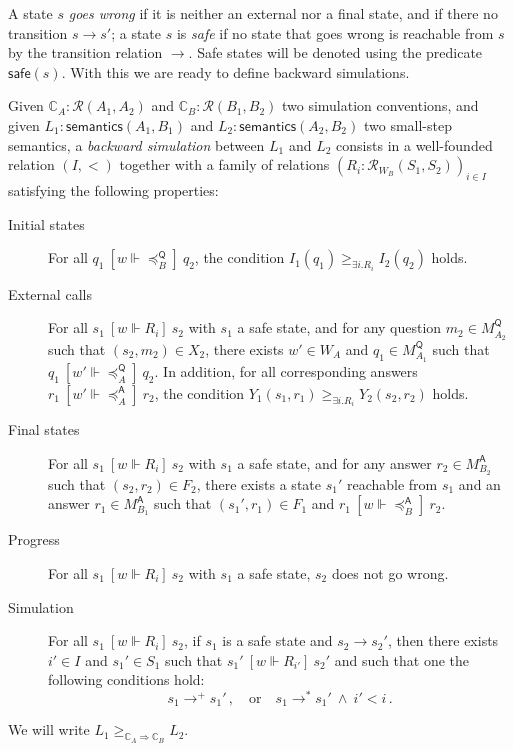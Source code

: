 \documentclass[acmsmall,timestamp,review]{acmart}
\newcommand{\kw}[1]{\ensuremath{ \mathsf{#1} }}
\newcommand{\ifr}[1]{\ [{#1}]\ }
\begin{document}
A state $s$ \emph{goes wrong}
if it is neither an external nor a final state,
and if there no transition $s \rightarrow s'$;
a state $s$ is \emph{safe}
if no state that goes wrong is reachable from $s$
by the transition relation $\rightarrow$.
Safe states will be denoted using the predicate $\kw{safe}(s)$.
With this we are ready to define backward simulations.

\begin{definition}
Given
$\mathbb{C}_A : \mathcal{R}(A_1, A_2)$ and
$\mathbb{C}_B : \mathcal{R}(B_1, B_2)$
two simulation conventions,
and given
$L_1 : \kw{semantics}(A_1, B_1)$ and
$L_2 : \kw{semantics}(A_2, B_2)$
two small-step semantics,
a \emph{backward simulation} between $L_1$ and $L_2$
consists in a
well-founded relation $(I, <)$
together with a family of relations
$(R_i : \mathcal{R}_{W_B}(S_1, S_2))_{i \in I}$
satisfying the following properties:
\begin{description}
\item[Initial states]
  For all
  $q_1 \ifr{w \Vdash {\preceq}_B^\kw{Q}} q_2$,
  the condition $I_1(q_1) \ge_{\exists i . R_i} I_2(q_2)$ holds.
\item[External calls]
  For all $s_1 \ifr{w \Vdash R_i} s_2$
  with $s_1$ a safe state, and
  for any question $m_2 \in M_{A_2}^\kw{Q}$
  such that $(s_2, m_2) \in X_2$,
  there exists $w' \in W_A$ and $q_1 \in M_{A_1}^\kw{Q}$
  such that $q_1 \ifr{w' \Vdash {\preceq}_A^\kw{Q}} q_2$.
  In addition, for all corresponding answers
  $r_1 \ifr{w' \Vdash {\preceq}_A^\kw{A}} r_2$,
  the condition $Y_1(s_1, r_1) \ge_{\exists i . R_i} Y_2(s_2, r_2)$ holds.
\item[Final states]
  For all $s_1 \ifr{w \Vdash R_i} s_2$
  with $s_1$ a safe state, and
  for any answer $r_2 \in M_{B_2}^\kw{A}$
  such that $(s_2, r_2) \in F_2$,
  there exists a state $s_1'$ reachable from $s_1$ and
  an answer $r_1 \in M_{B_1}^\kw{A}$ such that
  $(s_1', r_1) \in F_1$ and $r_1 \ifr{w \Vdash {\preceq}_B^\kw{A}} r_2$.
\item[Progress]
  For all $s_1 \ifr{w \Vdash R_i} s_2$
  with $s_1$ a safe state,
  $s_2$ does not go wrong.
\item[Simulation]
  For all $s_1 \ifr{w \Vdash R_i} s_2$,
  if $s_1$ is a safe state and $s_2 \rightarrow s_2'$,
  then there exists $i' \in I$ and $s_1' \in S_1$
  such that $s_1' \ifr{w \Vdash R_{i'}} s_2'$ and
  such that one the following conditions hold:
  \[
    s_1 \rightarrow^+ s_1' \,, \quad \mbox{or} \quad
    s_1 \rightarrow^* s_1' \:\wedge\: i' < i \,.
  \]
\end{description}
We will write $L_1 \ge_{\mathbb{C}_A \Rightarrow \mathbb{C}_B} L_2$.
\end{definition}
\end{document}
